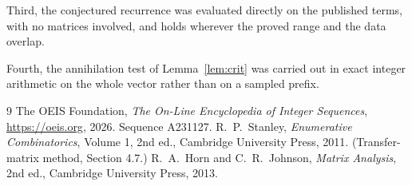 \documentclass[11pt,a4paper]{article}
\theoremstyle{plain}
\theoremstyle{definition}
\begin{document}
Third, the conjectured recurrence was evaluated directly on the published terms, with no
matrices involved, and holds wherever the proved range and the data overlap.

Fourth, the annihilation test of Lemma~\ref{lem:crit} was carried out in exact integer
arithmetic on the whole vector rather than on a sampled prefix.

\begin{thebibliography}{9}
 The OEIS Foundation, \emph{The On-Line Encyclopedia of Integer
Sequences}, \url{https://oeis.org}, 2026. Sequence A231127.
 R.~P.~Stanley, \emph{Enumerative Combinatorics}, Volume 1, 2nd ed.,
Cambridge University Press, 2011. (Transfer-matrix method, Section 4.7.)
 R.~A.~Horn and C.~R.~Johnson, \emph{Matrix Analysis}, 2nd ed., Cambridge
University Press, 2013.
\end{thebibliography}
\end{document}
